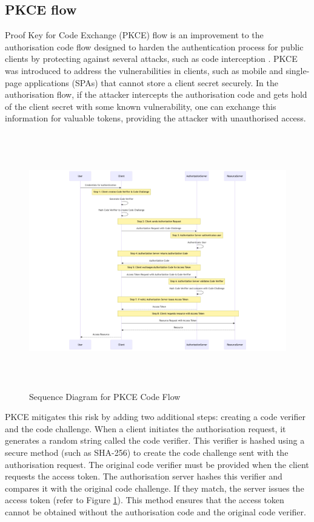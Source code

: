 \newpage
\subsection{PKCE flow}
\label{sec:pkce_flow}
Proof Key for Code Exchange (PKCE) flow is an improvement to the authorisation code flow designed to harden the authentication process for public clients by protecting against several attacks, such as code interception \citep{pkce}. PKCE was introduced to address the vulnerabilities in clients, such as mobile and single-page applications (SPAs) that cannot store a client secret securely. In the authorisation flow, if the attacker intercepts the authorisation code and gets hold of the client secret with some known vulnerability, one can exchange this information for valuable tokens, providing the attacker with unauthorised access. 


\begin{figure}[h!]

\label{fig:pkce_flow}
\includegraphics[height=420px, center]{pics/pkce.png}
\caption{Sequence Diagram for PKCE Code Flow}
\end{figure}

PKCE mitigates this risk by adding two additional steps: creating a code verifier and the code challenge. When a client initiates the authorisation request, it generates a random string called the code verifier. This verifier is hashed using a secure method (such as SHA-256) to create the code challenge sent with the authorisation request. The original code verifier must be provided when the client requests the access token. The authorisation server hashes this verifier and compares it with the original code challenge. If they match, the server issues the access token (refer to Figure \ref{fig:pkce_flow}). This method ensures that the access token cannot be obtained without the authorisation code and the original code verifier. 

